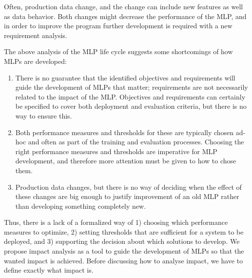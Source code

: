 \documentclass{article}
\theoremstyle{theorem}
\theoremstyle{definition}
\begin{document}
Often, production data change, and the change can include new features as well as data behavior. 
Both changes might decrease the performance of the MLP, and in order to improve the program further development is required with a new requirement analysis.

The above analysis of the MLP life cycle suggests some shortcomings of how MLPs are developed:
\begin{enumerate}

\item
There is no guarantee that the identified objectives and requirements will guide the development of MLPs that matter; requirements are not necessarily related to the impact of the MLP.
Objectives and requirements can certainly be specified to cover both deployment and evaluation criteria, but there is no way to ensure this.

\item
Both performance measures and thresholds for these are typically chosen ad-hoc and often as part of the training and evaluation processes.
Choosing the right performance measures and thresholds are imperative for MLP development, and therefore more attention must be given to how to chose them.

\item
Production data changes, but there is no way of deciding when the effect of these changes are big enough to justify improvement of an old MLP rather than developing something completely new.

\end{enumerate}

Thus, there is a lack of a formalized way of 1) choosing which performance measures to optimize, 2) setting thresholds that are sufficient for a system to be deployed, and 3) supporting the decision about which solutions to develop.
We propose impact analysis as a tool to guide the development of MLPs so that the wanted impact is achieved.
Before discussing how to analyse impact, we have to define exactly what impact is.
\end{document}
